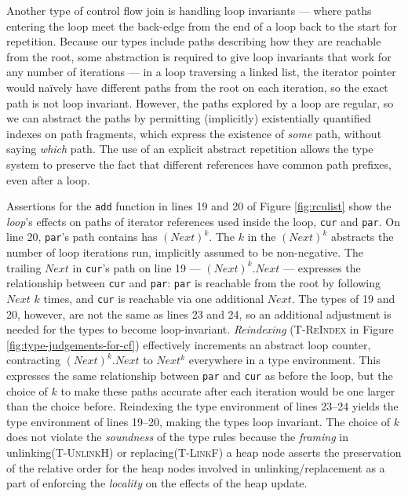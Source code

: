 Another type of control flow join is handling loop invariants --- where paths entering the loop meet the back-edge from the end of a loop back to the start for repetition.
Because our types include paths describing how they are reachable from the root, some abstraction is required to give loop invariants that work for any number of iterations --- in a loop traversing a linked list, the iterator pointer would na\"ively have different paths from the root on each iteration, so the exact path is not loop invariant.  However, the paths explored by a loop are regular, so we can abstract the paths by permitting (implicitly) existentially quantified indexes on path fragments, which express the existence of \emph{some} path, without saying \emph{which} path.  The use of an explicit abstract repetition allows the type system to preserve the fact that different references have common path prefixes, even after a loop.

Assertions for the \texttt{add} function in lines 19 and 20 of Figure \ref{fig:rculist} show the \textit{loop}'s effects on paths of iterator references used inside the loop, \texttt{cur} and \texttt{par}. 
On line 20, \texttt{par}'s path contains has $(Next)^{k}$.
The $k$ in the $(Next)^{k}$ abstracts the number of loop iterations run, implicitly assumed to be non-negative.
The trailing $Next$ in \texttt{cur}'s path on line 19 --- $(Next)^{k}.Next$ --- expresses the relationship between \texttt{cur} and \texttt{par}: \texttt{par} is reachable from the root by following $Next$ $k$ times, and \texttt{cur} is reachable via one additional $Next$.
The types of 19 and 20, however, are not the same as lines 23 and 24, so an additional adjustment is needed for the types to become loop-invariant.
\emph{Reindexing} (\textsc{T-ReIndex} in Figure \ref{fig:type-judgements-for-cf}) effectively increments an abstract loop counter, contracting $(Next)^k.Next$ to $Next^k$ everywhere in a type environment.  This expresses the same relationship between \texttt{par} and \texttt{cur} as before the loop, but the choice of $k$ to make these paths accurate after each iteration would be one larger than the choice before.
Reindexing the type environment of lines 23--24 yields the type environment of lines 19--20, making the types loop invariant. The choice of $k$ does not violate the \textit{soundness} of the type rules because the \textit{framing} in unlinking(\textsc{T-UnlinkH}) or replacing(\textsc{T-LinkF}) a heap node asserts the preservation of the relative order for the heap nodes involved in unlinking/replacement as a part of enforcing the \textit{locality} on the effects of the heap update.

